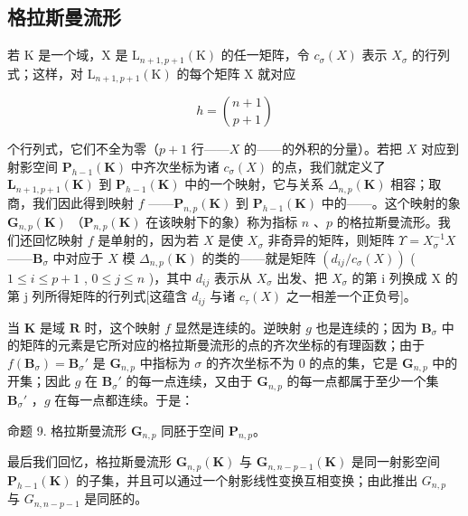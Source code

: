 \subsection{格拉斯曼流形}

若 K 是一个域，X 是 \(\mathrm{L}_{n+1,p+1}(\mathrm{K})\) 的任一矩阵，令 \(c_{\sigma}(X)\) 表示 \(X_{\sigma}\) 的行列式；这样，对 \(\mathrm{L}_{n+1,p+1}(\mathrm{K})\) 的每个矩阵 X 就对应

\[
h = \binom {n + 1} {p + 1}
\]

个行列式，它们不全为零（\(p + 1\) 行——\(X\) 的——的外积的分量）。若把 \(X\) 对应到射影空间 \(\mathbf{P}_{h-1}(\mathbf{K})\) 中齐次坐标为诸 \(c_{\sigma}(X)\) 的点，我们就定义了 \(\mathbf{L}_{n+1,p+1}(\mathbf{K})\) 到 \(\mathbf{P}_{h-1}(\mathbf{K})\) 中的一个映射，它与关系 \(\Delta_{n,p}(\mathbf{K})\) 相容；取商，我们因此得到映射 \(f\) ——\(\mathbf{P}_{n,p}(\mathbf{K})\) 到 \(\mathbf{P}_{h-1}(\mathbf{K})\) 中的——。这个映射的象 \(\mathbf{G}_{n,p}(\mathbf{K})\) （\(\mathbf{P}_{n,p}(\mathbf{K})\) 在该映射下的象）称为指标 \(n\) 、\(p\) 的格拉斯曼流形。我们还回忆映射 \(f\) 是单射的，因为若 \(X\) 是使 \(X_{\sigma}\) 非奇异的矩阵，则矩阵 \(\Upsilon = X_{\sigma}^{-1}X\) ——\(\mathbf{B}_{\sigma}\) 中对应于 \(X\) 模 \(\Delta_{n,p}(\mathbf{K})\) 的类的——就是矩阵 \((d_{ij}/c_{\sigma}(X))\) ( \(1 \leqslant i \leqslant p + 1\) , \(0 \leqslant j \leqslant n\) )，其中 \(d_{ij}\) 表示从 \(X_{\sigma}\) 出发、把 \(X_{\sigma}\) 的第 i 列换成 X 的第 j 列所得矩阵的行列式{[}这蕴含 \(d_{ij}\) 与诸 \(c_{\tau}(X)\) 之一相差一个正负号{]}。

当 \(\mathbf{K}\) 是域 \(\mathbf{R}\) 时，这个映射 \(f\) 显然是连续的。逆映射 \(g\) 也是连续的；因为 \(\mathbf{B}_{\sigma}\) 中的矩阵的元素是它所对应的格拉斯曼流形的点的齐次坐标的有理函数；由于 \(f(\mathbf{B}_{\sigma}) = \mathbf{B}_{\sigma}'\) 是 \(\mathbf{G}_{n,p}\) 中指标为 \(\sigma\) 的齐次坐标不为 \(0\) 的点的集，它是 \(\mathbf{G}_{n,p}\) 中的开集；因此 \(g\) 在 \(\mathbf{B}_{\sigma}'\) 的每一点连续，又由于 \(\mathbf{G}_{n,p}\) 的每一点都属于至少一个集 \(\mathbf{B}_{\sigma}'\) ，\(g\) 在每一点都连续。于是：

命题 9. 格拉斯曼流形 \(\mathbf{G}_{n,p}\) 同胚于空间 \(\mathbf{P}_{n,p}\)。

最后我们回忆，格拉斯曼流形 \(\mathbf{G}_{n,p}(\mathbf{K})\) 与 \(\mathbf{G}_{n,n-p-1}(\mathbf{K})\) 是同一射影空间 \(\mathbf{P}_{h-1}(\mathbf{K})\) 的子集，并且可以通过一个射影线性变换互相变换；由此推出 \(G_{n,p}\) 与 \(G_{n,n-p-1}\) 是同胚的。
\relax{}
\ExerciseGroupsStart
